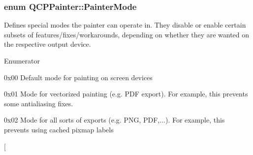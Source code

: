 \subsubsection[{\texorpdfstring{Painter\+Mode}{PainterMode}}]{\setlength{\rightskip}{0pt plus 5cm}enum {\bf Q\+C\+P\+Painter\+::\+Painter\+Mode}}\hypertarget{class_q_c_p_painter_a156cf16444ff5e0d81a73c615fdb156d}{}\label{class_q_c_p_painter_a156cf16444ff5e0d81a73c615fdb156d}
Defines special modes the painter can operate in. They disable or enable certain subsets of features/fixes/workarounds, depending on whether they are wanted on the respective output device. \begin{Desc}
\item[Enumerator]\par
\begin{description}
\item[{\em 
pm\+Default\hypertarget{class_q_c_p_painter_a156cf16444ff5e0d81a73c615fdb156daf70f0b3a3322c7edb6273a817ef9efcd}{}\label{class_q_c_p_painter_a156cf16444ff5e0d81a73c615fdb156daf70f0b3a3322c7edb6273a817ef9efcd}
}]{\ttfamily 0x00} Default mode for painting on screen devices \item[{\em 
pm\+Vectorized\hypertarget{class_q_c_p_painter_a156cf16444ff5e0d81a73c615fdb156daa4e636d20dd73397079efd4900abe5dd}{}\label{class_q_c_p_painter_a156cf16444ff5e0d81a73c615fdb156daa4e636d20dd73397079efd4900abe5dd}
}]{\ttfamily 0x01} Mode for vectorized painting (e.\+g. P\+DF export). For example, this prevents some antialiasing fixes. \item[{\em 
pm\+No\+Caching\hypertarget{class_q_c_p_painter_a156cf16444ff5e0d81a73c615fdb156da8ce8e67295145ede7599425bdfaaceff}{}\label{class_q_c_p_painter_a156cf16444ff5e0d81a73c615fdb156da8ce8e67295145ede7599425bdfaaceff}
}]{\ttfamily 0x02} Mode for all sorts of exports (e.\+g. P\+NG, P\+DF,...). For example, this prevents using cached pixmap labels \item[{\em 
}
\end{description}
\end{Desc}
